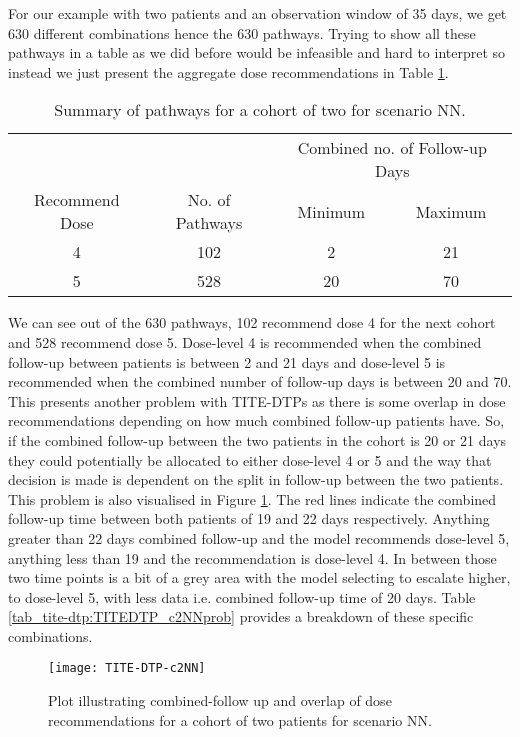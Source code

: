 For our example with two patients and an observation window of 35 days, we get 630 different combinations hence the 630 pathways. Trying to show all these pathways in a table as we did before would be infeasible and hard to interpret so instead we just present the aggregate dose recommendations in Table \ref{tab_tite-dtp:TITEDTP_c2NN}. 

\begin{table}[H]
	\centering
	\caption{Summary of pathways for a cohort of two for scenario NN. }
	\label{tab_tite-dtp:TITEDTP_c2NN}
	\begin{tabular}{cccc}
		\hline
		\multicolumn{1}{l}{} & \multicolumn{1}{l}{} & \multicolumn{2}{c}{Combined no. of Follow-up Days} \\ \cline{3-4} 
		Recommend Dose & No. of Pathways & Minimum & Maximum \\ \hline
		4              & 102             & 2       & 21      \\
		5              & 528             & 20      & 70      \\ \hline
	\end{tabular}
\end{table}

We can see out of the 630 pathways, 102 recommend dose 4 for the next cohort and 528 recommend dose 5. Dose-level 4 is recommended when the combined follow-up between patients is between 2 and 21 days and dose-level 5 is recommended when the combined number of follow-up days is between 20 and 70. This presents another problem with TITE-DTPs as there is some overlap in dose recommendations depending on how much combined follow-up patients have. So, if the combined follow-up between the two patients in the cohort is 20 or 21 days they could potentially be allocated to either dose-level 4 or 5 and the way that decision is made is dependent on the split in follow-up between the two patients. This problem is also visualised in Figure \ref{fig_tite-dtp:c2NNprob}. The red lines indicate the combined follow-up time between both patients of 19 and 22 days respectively. Anything greater than 22 days combined follow-up and the model recommends dose-level 5, anything less than 19 and the recommendation is dose-level 4. In between those two time points is a bit of a grey area with the model selecting to escalate higher, to dose-level 5, with less data i.e. combined follow-up time of 20 days. Table \ref{tab_tite-dtp:TITEDTP_c2NNprob} provides a breakdown of these specific combinations. 

\begin{figure}[h!]
	\centering
	\caption[Combined follow-up and dose decisions for a cohort of two.]{Plot illustrating combined-follow up and overlap of dose recommendations for a cohort of two patients for scenario NN.}
	\label{fig_tite-dtp:c2NNprob}
	\texttt{[image: TITE-DTP-c2NN]}
\end{figure}

